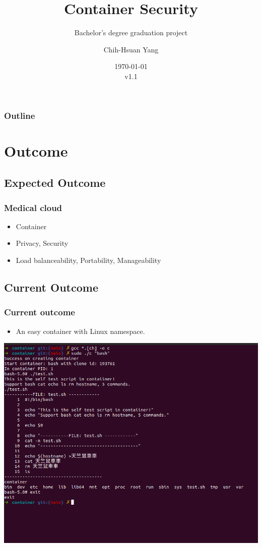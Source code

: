 \documentclass{beamer}
\title{Container Security}
\subtitle{Bachelor's degree graduation project}
\author{Chih-Hsuan Yang}
\institute{National Sun Yat-sen University}
\date{\today\\v1.1}
\begin{document}
\begin{frame}
    \titlepage
\end{frame}

\begin{frame}
    \frametitle{Outline}
    \tableofcontents
\end{frame}

\section{Outcome}
\subsection{Expected Outcome}
\begin{frame}
    \frametitle{Medical cloud}
    \begin{itemize}
        \item Container
        \item Privacy, Security
        \item Load balanceability, Portability, Manageability
    \end{itemize}
\end{frame}

\subsection{Current Outcome}
\begin{frame}
    \frametitle{Current outcome}
    \begin{itemize}
        \item An easy container with Linux namespace.
    \end{itemize}
    \centering\includegraphics[width=1.0\textwidth]{cur_cont.png}
\end{frame}
\end{document}
